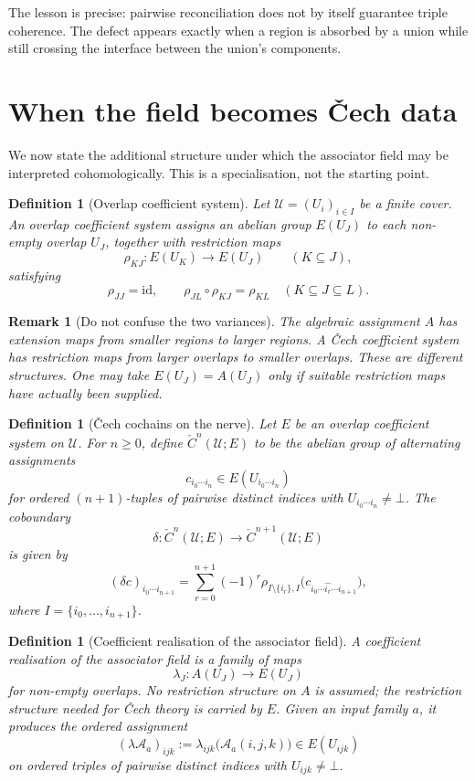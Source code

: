 \documentclass[11pt]{article}
\newtheorem{definition}[theorem]{Definition}
\newtheorem{remark}[theorem]{Remark}
\newcommand{\Cech}{\check{C}}
\begin{document}
The lesson is precise: pairwise reconciliation does not by itself guarantee triple coherence. The defect appears exactly when a region is absorbed by a union while still crossing the interface between the union's components.

\section{When the field becomes \v{C}ech data}\label{sec:cech-data}

We now state the additional structure under which the associator field may be interpreted cohomologically. This is a specialisation, not the starting point.

\begin{definition}[Overlap coefficient system]
Let \(\mathcal U=(U_i)_{i\in I}\) be a finite cover. An overlap coefficient system assigns an abelian group \(E(U_J)\) to each non-empty overlap \(U_J\), together with restriction maps
\[
\rho_{KJ}:E(U_K)\to E(U_J)
\qquad(K\subseteq J),
\]
satisfying
\[
\rho_{JJ}=\mathrm{id},
\qquad
\rho_{JL}\circ \rho_{KJ}=\rho_{KL}
\quad (K\subseteq J\subseteq L).
\]
\end{definition}

\begin{remark}[Do not confuse the two variances]
The algebraic assignment \(A\) has extension maps from smaller regions to larger regions. A \v{C}ech coefficient system has restriction maps from larger overlaps to smaller overlaps. These are different structures. One may take \(E(U_J)=A(U_J)\) only if suitable restriction maps have actually been supplied.
\end{remark}

\begin{definition}[\v{C}ech cochains on the nerve]
Let \(E\) be an overlap coefficient system on \(\mathcal U\). For \(n\geq 0\), define \(\Cech^n(\mathcal U;E)\) to be the abelian group of alternating assignments
\[
c_{i_0\cdots i_n}\in E(U_{i_0\cdots i_n})
\]
for ordered \((n+1)\)-tuples of pairwise distinct indices with \(U_{i_0\cdots i_n}\neq \bot\). The coboundary
\[
\delta:\Cech^n(\mathcal U;E)\to \Cech^{n+1}(\mathcal U;E)
\]
is given by
\[
(\delta c)_{i_0\cdots i_{n+1}}
=
\sum_{r=0}^{n+1}(-1)^r
\rho_{I\setminus\{i_r\},I}
\bigl(c_{i_0\cdots \widehat{i_r}\cdots i_{n+1}}\bigr),
\]
where \(I=\{i_0,\ldots,i_{n+1}\}\).
\end{definition}

\begin{definition}[Coefficient realisation of the associator field]
A coefficient realisation of the associator field is a family of maps
\[
\lambda_J:A(U_J)\to E(U_J)
\]
for non-empty overlaps. No restriction structure on \(A\) is assumed; the restriction structure needed for \v{C}ech theory is carried by \(E\). Given an input family \(a\), it produces the ordered assignment
\[
(\lambda\mathcal A_a)_{ijk}:=\lambda_{ijk}\bigl(\mathcal A_a(i,j,k)\bigr)
\in E(U_{ijk})
\]
on ordered triples of pairwise distinct indices with \(U_{ijk}\neq \bot\).
\end{definition}
\end{document}
